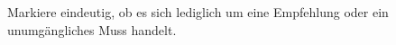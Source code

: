 \documentclass[a4paper,titlepage=true,twoside]{scrartcl}
\newcommand{\PreserveBackslash}[1]{\let\temp=\\#1\let\\=\temp}
\begin{document}
Markiere eindeutig, ob es sich lediglich um eine Empfehlung oder ein 
unumgängliches Muss handelt.

\end{document}
